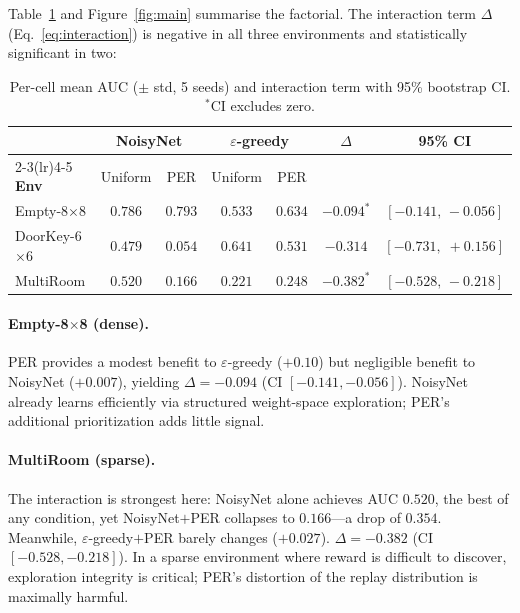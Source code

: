 \documentclass{article}
\begin{document}
Table~\ref{tab:results} and Figure~\ref{fig:main} summarise the factorial.
The interaction term $\Delta$ (Eq.~\ref{eq:interaction}) is negative in all
three environments and statistically significant in two:

\begin{table}[h]
\centering
\caption{Per-cell mean AUC ($\pm$ std, 5 seeds) and interaction term with
         95\% bootstrap CI. $^*$CI excludes zero.}
\label{tab:results}
\small
\setlength{\tabcolsep}{5pt}
\begin{tabular}{lcccccc}
\toprule
 & \multicolumn{2}{c}{\textbf{NoisyNet}} & \multicolumn{2}{c}{\textbf{$\varepsilon$-greedy}}
 & \multirow{2}{*}{\textbf{$\Delta$}} & \multirow{2}{*}{\textbf{95\% CI}} \\
\cmidrule(lr){2-3}\cmidrule(lr){4-5}
\textbf{Env} & Uniform & PER & Uniform & PER & & \\
\midrule
Empty-8$\times$8   & $0.786$ & $0.793$ & $0.533$ & $0.634$
  & $-0.094^*$ & $[-0.141,\,-0.056]$ \\
DoorKey-6$\times$6 & $0.479$ & $0.054$ & $0.641$ & $0.531$
  & $-0.314$ & $[-0.731,\;+0.156]$ \\
MultiRoom          & $0.520$ & $0.166$ & $0.221$ & $0.248$
  & $-0.382^*$ & $[-0.528,\,-0.218]$ \\
\bottomrule
\end{tabular}
\end{table}

\paragraph{Empty-8$\times$8 (dense).}
PER provides a modest benefit to $\varepsilon$-greedy ($+0.10$) but negligible
benefit to NoisyNet ($+0.007$), yielding $\Delta=-0.094$
(CI $[-0.141, -0.056]$).
NoisyNet already learns efficiently via structured weight-space exploration;
PER's additional prioritization adds little signal.

\paragraph{MultiRoom (sparse).}
The interaction is strongest here: NoisyNet alone achieves AUC $0.520$,
the best of any condition, yet NoisyNet$+$PER collapses to $0.166$---a
drop of $0.354$.
Meanwhile, $\varepsilon$-greedy$+$PER barely changes ($+0.027$).
$\Delta=-0.382$ (CI $[-0.528, -0.218]$).
In a sparse environment where reward is difficult to discover, exploration
integrity is critical; PER's distortion of the replay distribution is
maximally harmful.
\end{document}
